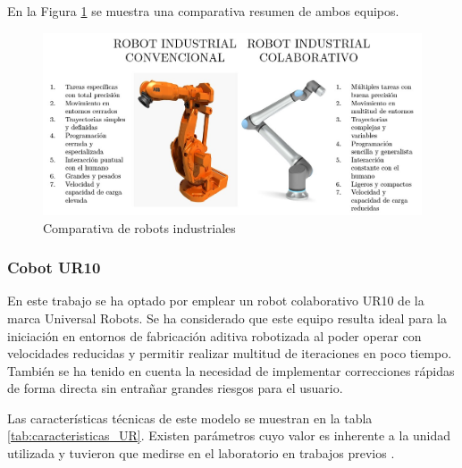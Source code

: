 En la Figura \ref{fig:comparativa_robots} se muestra una comparativa resumen de ambos equipos.
\begin{figure}[h!]
\centering
    \includegraphics[scale=0.5]{figuras/comparativa_robots_v2.jpg}
    \caption{Comparativa de robots industriales}
    \label{fig:comparativa_robots}
\end{figure}

\subsubsection*{Cobot UR10}
En este trabajo se ha optado por emplear un robot colaborativo UR10 de la marca Universal Robots. Se ha considerado que este equipo resulta ideal para la iniciación en entornos de fabricación aditiva robotizada al poder operar con velocidades reducidas y permitir realizar multitud de iteraciones en poco tiempo. También se ha tenido en cuenta la necesidad de implementar correcciones rápidas de forma directa sin entrañar grandes riesgos para el usuario.

 Las características técnicas de este modelo se muestran en la tabla \ref{tab:caracteristicas_UR}. Existen parámetros cuyo valor es inherente a la unidad utilizada y tuvieron que medirse en el laboratorio en trabajos previos \cite{TFM_SanchoAmparo}.


